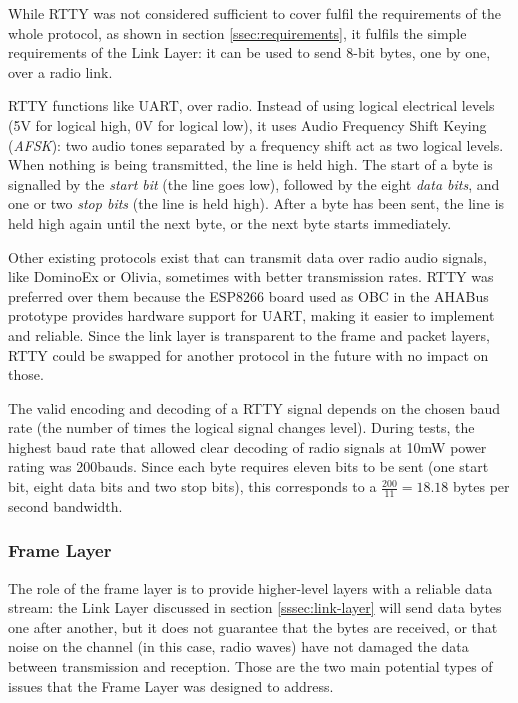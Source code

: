 
While RTTY was not considered sufficient to cover fulfil the requirements of
the whole protocol, as shown in section \ref{ssec:requirements}, it fulfils the
simple requirements of the Link Layer: it can be used to send 8-bit bytes, one
by one, over a radio link.

RTTY functions like UART, over radio. Instead of using logical electrical levels
(5V for logical high, 0V for logical low), it uses Audio Frequency Shift Keying
(\textit{AFSK}): two audio tones separated by a frequency shift act as two
logical levels. When nothing is being transmitted, the line is held high. The
start of a byte is signalled by the \textit{start bit} (the line goes low),
followed by the eight \textit{data bits}, and one or two \textit{stop bits} (the
line is held high). After a byte has been sent, the line is held high again
until the next byte, or the next byte starts immediately.

Other existing protocols exist that can transmit data over radio audio signals,
like DominoEx or Olivia, sometimes with better transmission rates. RTTY was
preferred over them because the ESP8266 board used as OBC in the AHABus
prototype provides hardware support for UART, making it easier to implement and
reliable. Since the link layer is transparent to the frame and packet layers,
RTTY could be swapped for another protocol in the future with no impact on
those.

The valid encoding and decoding of a RTTY signal depends on the chosen baud
rate (the number of times the logical signal changes level). During tests,
the highest baud rate that allowed clear decoding of radio signals at 10mW
power rating was 200bauds. Since each byte requires eleven bits to be sent
(one start bit, eight data bits and two stop bits), this corresponds to a
\(\frac{200}{11}=18.18\) bytes per second bandwidth.

\subsubsection{Frame Layer}
\label{sssec:frame-layer}

The role of the frame layer is to provide higher-level layers with a reliable
data stream: the Link Layer discussed in section \ref{sssec:link-layer} will
send data bytes one after another, but it does not guarantee that the bytes are
received, or that noise on the channel (in this case, radio waves) have not
damaged the data between transmission and reception. Those are the two main
potential types of issues that the Frame Layer was designed to address.

